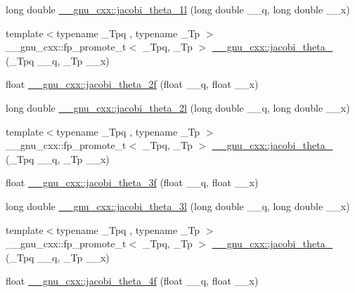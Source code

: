 \begin{DoxyCompactItemize}
\item 
long double \hyperlink{group__mathsf__gnu_ga823eba555ecac89556a0f4c1e62dbc5a}{\+\_\+\+\_\+gnu\+\_\+cxx\+::jacobi\+\_\+theta\+\_\+1l} (long double \+\_\+\+\_\+q, long double \+\_\+\+\_\+x)
\item 
{\footnotesize template$<$typename \+\_\+\+Tpq , typename \+\_\+\+Tp $>$ }\\\+\_\+\+\_\+gnu\+\_\+cxx\+::fp\+\_\+promote\+\_\+t$<$ \+\_\+\+Tpq, \+\_\+\+Tp $>$ \hyperlink{group__mathsf__gnu_gaf6b13dac1f112a870299d75cb4cf42cc}{\+\_\+\+\_\+gnu\+\_\+cxx\+::jacobi\+\_\+theta\+\_} (\+\_\+\+Tpq \+\_\+\+\_\+q, \+\_\+\+Tp \+\_\+\+\_\+x)
\item 
float \hyperlink{group__mathsf__gnu_gaa99e91c0753410a42b57cbf417cf7ea0}{\+\_\+\+\_\+gnu\+\_\+cxx\+::jacobi\+\_\+theta\+\_\+2f} (float \+\_\+\+\_\+q, float \+\_\+\+\_\+x)
\item 
long double \hyperlink{group__mathsf__gnu_ga2db5cb3025b9068e79dc7aa21bc9af5b}{\+\_\+\+\_\+gnu\+\_\+cxx\+::jacobi\+\_\+theta\+\_\+2l} (long double \+\_\+\+\_\+q, long double \+\_\+\+\_\+x)
\item 
{\footnotesize template$<$typename \+\_\+\+Tpq , typename \+\_\+\+Tp $>$ }\\\+\_\+\+\_\+gnu\+\_\+cxx\+::fp\+\_\+promote\+\_\+t$<$ \+\_\+\+Tpq, \+\_\+\+Tp $>$ \hyperlink{group__mathsf__gnu_gaf4eac2990db1dadba66ae688ceaa6403}{\+\_\+\+\_\+gnu\+\_\+cxx\+::jacobi\+\_\+theta\+\_} (\+\_\+\+Tpq \+\_\+\+\_\+q, \+\_\+\+Tp \+\_\+\+\_\+x)
\item 
float \hyperlink{group__mathsf__gnu_ga6ff9738978be029e90e1f144ab4aa165}{\+\_\+\+\_\+gnu\+\_\+cxx\+::jacobi\+\_\+theta\+\_\+3f} (float \+\_\+\+\_\+q, float \+\_\+\+\_\+x)
\item 
long double \hyperlink{group__mathsf__gnu_ga313109bbf08d81e93196eb73c2047dd2}{\+\_\+\+\_\+gnu\+\_\+cxx\+::jacobi\+\_\+theta\+\_\+3l} (long double \+\_\+\+\_\+q, long double \+\_\+\+\_\+x)
\item 
{\footnotesize template$<$typename \+\_\+\+Tpq , typename \+\_\+\+Tp $>$ }\\\+\_\+\+\_\+gnu\+\_\+cxx\+::fp\+\_\+promote\+\_\+t$<$ \+\_\+\+Tpq, \+\_\+\+Tp $>$ \hyperlink{group__mathsf__gnu_ga676501b6284d5702a3dc61252e6c78ab}{\+\_\+\+\_\+gnu\+\_\+cxx\+::jacobi\+\_\+theta\+\_} (\+\_\+\+Tpq \+\_\+\+\_\+q, \+\_\+\+Tp \+\_\+\+\_\+x)
\item 
float \hyperlink{group__mathsf__gnu_ga57dcc5ae4b1a3d1e38adccad85204bca}{\+\_\+\+\_\+gnu\+\_\+cxx\+::jacobi\+\_\+theta\+\_\+4f} (float \+\_\+\+\_\+q, float \+\_\+\+\_\+x)

\end{DoxyCompactItemize}
